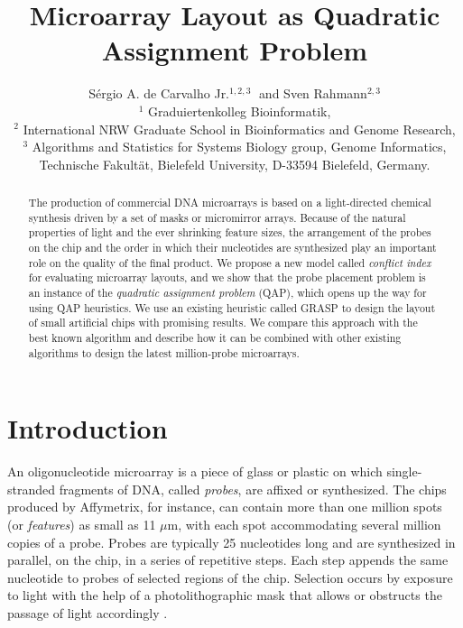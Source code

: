 \documentclass[english]{lni}
\begin{document}
\title{Microarray Layout as Quadratic Assignment Problem}
\author{S\'ergio A. de Carvalho Jr.${}^{1,2,3}$
$\;$and
Sven Rahmann${}^{2,3}$\\[1ex]
${}^1$ Graduiertenkolleg Bioinformatik,\\
${}^2$ International NRW Graduate School in Bioinformatics and Genome Research,\\
${}^3$ Algorithms and Statistics for Systems Biology group, Genome Informatics,\\
Technische Fakult\"at, Bielefeld University, D-33594 Bielefeld, Germany.
}

\maketitle

\begin{abstract}
The production of commercial DNA microarrays is based on a
light-di\-rected chemical synthesis driven by a set of masks or
micromirror arrays. Because of the natural properties of light and the
ever shrinking feature sizes, the arrangement of the probes on the
chip and the order in which their nucleotides are synthesized play an
important role on the quality of the final product.
We propose a new model called \emph{conflict index} for evaluating
microarray layouts, and we show that the probe placement problem is an
instance of the \emph{quadratic assignment problem} (QAP), which opens
up the way for using QAP heuristics. We use an existing heuristic
called GRASP to design the layout of small artificial chips with
promising results. We compare this approach with the best known
algorithm and describe how it can be combined with other existing
algorithms to design the latest million-probe microarrays.

\end{abstract}

\section{Introduction}

An oligonucleotide microarray is a piece of glass or plastic on which
single-stranded fragments of DNA, called \emph{probes}, are affixed or
synthesized. The chips produced by Affymetrix, for instance, can contain more
than one million spots (or \emph{features}) as small as 11 $\mu$m, with each
spot accommodating several million copies of a probe. Probes are typically 25
nucleotides long and are synthesized in parallel, on the chip, in a series of
repetitive steps. Each step appends the same nucleotide to probes of selected
regions of the chip. Selection occurs by exposure to light with the help of a
photolithographic mask that allows or obstructs the passage of light
accordingly \cite{FODOR91}.
\end{document}
